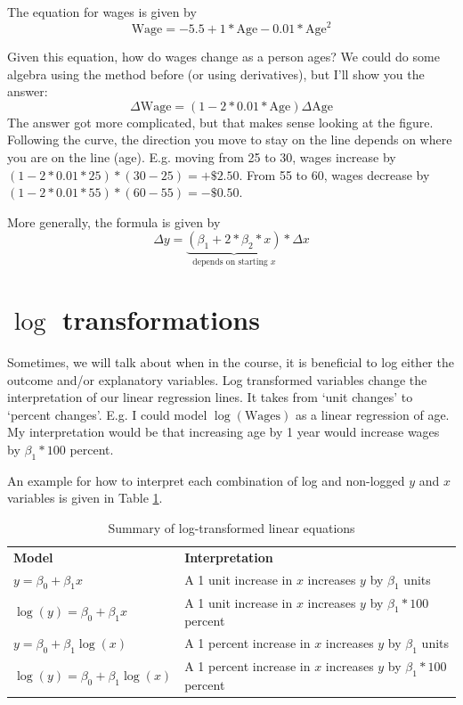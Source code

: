 \documentclass[12pt]{article}
\begin{document}
The equation for wages is given by 
$$
  \text{Wage} = -5.5 + 1 * \text{Age} - 0.01 * \text{Age}^2
$$

Given this equation, how do wages change as a person ages? We could do some algebra using the method before (or using derivatives), but I'll show you the answer:
$$
  \Delta \text{Wage} = \left( 1 - 2 * 0.01 * \text{Age} \right) \Delta \text{Age}
$$
The answer got more complicated, but that makes sense looking at the figure. Following the curve, the direction you move to stay on the line depends on where you are on the line (age). E.g. moving from 25 to 30, wages increase by $(1 - 2 * 0.01 * 25) * (30 - 25) = +\$2.50$. From 55 to 60, wages decrease by $(1 - 2 * 0.01 * 55) * (60 - 55) = -\$0.50$.

More generally, the formula is given by 
$$
  \Delta y = \underbrace{(\beta_1 + 2 * \beta_2 * x)}_{\text{depends on starting } x} * \Delta x 
$$


\section{\texorpdfstring{$\log$}{log} transformations}

Sometimes, we will talk about when in the course, it is beneficial to log either the outcome and/or explanatory variables. Log transformed variables change the interpretation of our linear regression lines. It takes from `unit changes' to `percent changes'. E.g. I could model $\log(\text{Wages})$ as a linear regression of age. My interpretation would be that increasing age by 1 year would increase wages by $\beta_1 * 100$ percent.

An example for how to interpret each combination of log and non-logged $y$ and $x$ variables is given in Table \ref{tab:log_transformations}.

\begin{table}
  \caption{Summary of log-transformed linear equations}
  \label{tab:log_transformations}

  \begin{tabular}{@{}
    p{} p{}
  @{}}
    \toprule
    \textbf{Model} & \textbf{Interpretation} \\

    \addlinespace[1mm]
    \midrule
    \addlinespace[1mm]

    $y = \beta_0 + \beta_1 x$ & 
    A 1 unit increase in $x$ increases $y$ by $\beta_1$ units \\

    $\log(y) = \beta_0 + \beta_1 x$ & 
    A 1 unit increase in $x$ increases $y$ by $\beta_1 * 100$ percent \\

    $y = \beta_0 + \beta_1 \log(x)$ & 
    A 1 percent increase in $x$ increases $y$ by $\beta_1$ units \\

    $\log(y) = \beta_0 + \beta_1 \log(x)$ & 
    A 1 percent increase in $x$ increases $y$ by $\beta_1 * 100$ percent \\

    \bottomrule
  \end{tabular}
\end{table}
\end{document}
